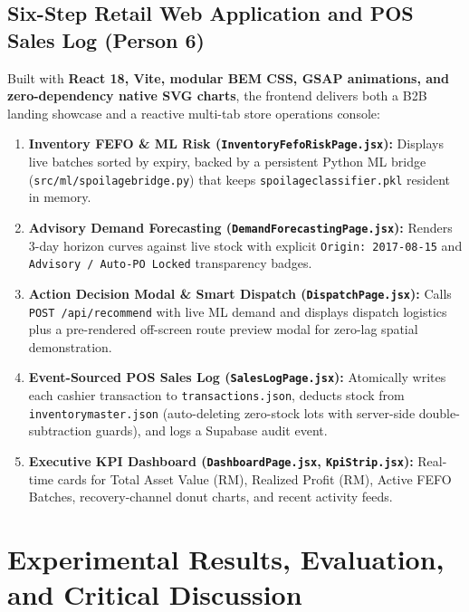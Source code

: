 \documentclass[11pt,a4paper]{article}
\renewcommand{\_}{\oldunderscore\allowbreak}
\begin{document}
\subsection{Six-Step Retail Web Application and POS Sales Log (Person 6)}
Built with \textbf{React 18, Vite, modular BEM CSS, GSAP animations, and zero-dependency native SVG charts}, the frontend delivers both a B2B landing showcase and a reactive multi-tab store operations console:
\begin{enumerate}[leftmargin=18pt, itemsep=1.5pt]
    \item \textbf{Inventory FEFO \& ML Risk (\texttt{InventoryFefoRiskPage.jsx}):} Displays live batches sorted by expiry, backed by a persistent Python ML bridge (\texttt{src/ml/spoilage\_bridge.py}) that keeps \texttt{spoilage\_classifier.pkl} resident in memory.
    \item \textbf{Advisory Demand Forecasting (\texttt{DemandForecastingPage.jsx}):} Renders 3-day horizon curves against live stock with explicit \texttt{Origin: 2017-08-15} and \texttt{Advisory / Auto-PO Locked} transparency badges.
    \item \textbf{Action Decision Modal \& Smart Dispatch (\texttt{DispatchPage.jsx}):} Calls \texttt{POST /api/recommend} with live ML demand and displays dispatch logistics plus a pre-rendered off-screen route preview modal for zero-lag spatial demonstration.
    \item \textbf{Event-Sourced POS Sales Log (\texttt{SalesLogPage.jsx}):} Atomically writes each cashier transaction to \texttt{transactions.json}, deducts stock from \texttt{inventory\_master.json} (auto-deleting zero-stock lots with server-side double-subtraction guards), and logs a Supabase audit event.
    \item \textbf{Executive KPI Dashboard (\texttt{DashboardPage.jsx}, \texttt{KpiStrip.jsx}):} Real-time cards for Total Asset Value (RM), Realized Profit (RM), Active FEFO Batches, recovery-channel donut charts, and recent activity feeds.
\end{enumerate}

\section{Experimental Results, Evaluation, and Critical Discussion}
\end{document}
